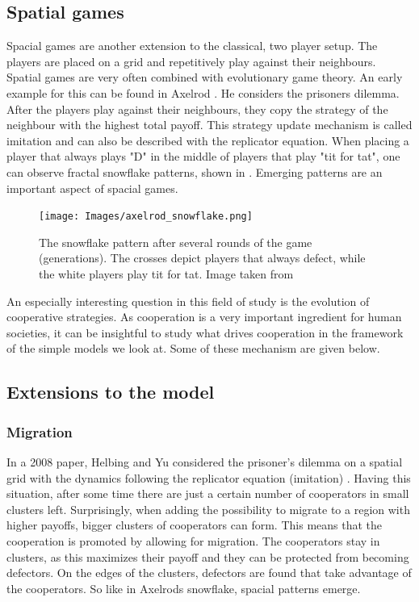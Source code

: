 \documentclass[12pt,oneside,a4paper,fleqn]{article}
\begin{document}
\subsection{Spatial games}
Spacial games are another extension to the classical, two player setup. The players are placed on a grid and repetitively play against their neighbours. Spatial games are very often combined with evolutionary game theory. An early example for this can be found in Axelrod \cite{axelrod1984evolution}. He considers the prisoners dilemma. After the players play against their neighbours, they copy the strategy of the neighbour with the highest total payoff. This strategy update mechanism is called imitation and can also be described with the replicator equation. When placing a player that always plays "D" in the middle of players that play "tit for tat", one can observe fractal snowflake patterns, shown in . Emerging patterns are an important aspect of spacial games.

\begin{figure}[h]
    \centering
    \texttt{[image: Images/axelrod\_snowflake.png]}
    \caption{The snowflake pattern after several rounds of the game (generations). The crosses depict players that always defect, while the white players play tit for tat. Image taken from \cite{axelrod1984evolution}}
    \label{fig:axelrod_snowflake}
\end{figure}

An especially interesting question in this field of study is the evolution of cooperative strategies. As cooperation is a very important ingredient for human societies, it can be insightful to study what drives cooperation in the framework of the simple models we look at. Some of these mechanism are given below.

\subsection{Extensions to the model}

\subsubsection{Migration}
In a 2008 paper, Helbing and Yu considered the prisoner’s dilemma on a spatial grid with the dynamics following the replicator equation (imitation) \cite{helbing_migration_2008}. Having this situation, after some time there are just a certain number of cooperators in small clusters left. Surprisingly, when adding the possibility to migrate to a region with higher payoffs, bigger clusters of cooperators can form. This means that the cooperation is promoted by allowing for migration. The cooperators stay in clusters, as this maximizes their payoff and they can be protected from becoming defectors. On the edges of the clusters, defectors are found that take advantage of the cooperators. So like in Axelrods snowflake, spacial patterns emerge.
\end{document}
